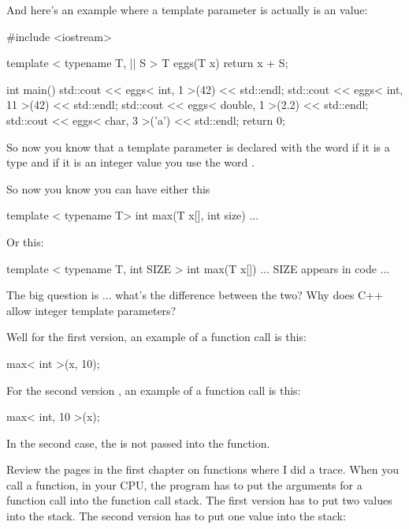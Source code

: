 And here's an example where a template parameter is actually is an  value:

\begin{consolethree}[escapeinside=||]
#include <iostream>

template < typename T, || S >
T eggs(T x)
{
    return x + S;
}

int main()
{
    std::cout << eggs< int, 1 >(42) << std::endl;
    std::cout << eggs< int, 11 >(42) << std::endl;
    std::cout << eggs< double, 1 >(2.2) << std::endl;
    std::cout << eggs< char, 3 >('a') << std::endl;
    return 0;
}
\end{consolethree}

So now you know that a template parameter is declared with the word  if it is a type and if it is an integer value you use the word .



So now you know you can have either this

\begin{consolethree}[escapeinside=||]
template < typename T>
int max(T x[], int size)
{
    ...
}
\end{consolethree}

Or this:

\begin{consolethree}[escapeinside=||]
template < typename T, int SIZE >
int max(T x[])
{
    ... SIZE appears in code ...
}
\end{consolethree}

The big question is ... what's the difference between the two? Why
does C++ allow integer template parameters?

Well for the first version, an example of a function call is this:
\begin{console}
max< int >(x, 10);
\end{console}
For the second version , an example of a function call is this:

\begin{console}
max< int, 10 >(x);
\end{console}

In the second case, the  is not passed into the function.

Review the  pages in the first chapter on
functions where I did a trace. When you call a function, in your CPU,
the program has to put the arguments for a function call into the
function call stack. The first version has to put two values into the
stack. The second version has to put one value into the stack:

